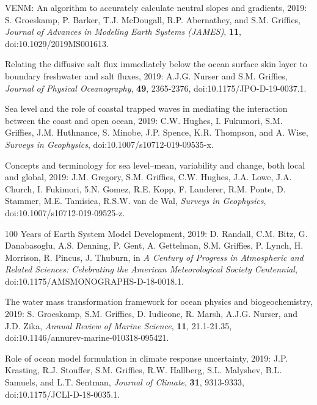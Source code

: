 \begin{etaremune}
\item VENM: An algorithm to accurately calculate neutral slopes and gradients, 2019: S. Groeskamp, P. Barker, T.J. McDougall, R.P. Abernathey, and S.M. Grif\/f\/ies, {\it Journal of Advances in Modeling Earth Systems (JAMES)}, {\bf 11}, doi:10.1029/2019MS001613.

\item Relating the diffusive salt flux immediately below the ocean surface skin layer to boundary freshwater and salt fluxes, 2019: A.J.G. Nurser and S.M. Grif\/f\/ies, {\it Journal of Physical Oceanography}, {\bf 49}, 2365-2376, doi:10.1175/JPO-D-19-0037.1.

\item Sea level and the role of coastal trapped waves in mediating the interaction between the coast and open ocean, 2019: C.W. Hughes, I. Fukumori, S.M. Grif\/f\/ies, J.M. Huthnance, S. Minobe, J.P. Spence, K.R. Thompson, and A. Wise, {\it Surveys in Geophysics},
doi:10.1007/s10712-019-09535-x.

\item Concepts and terminology for sea level--mean, variability and change, both local and global, 2019: J.M. Gregory, S.M. Grif\/f\/ies, C.W. Hughes, J.A. Lowe, J.A. Church, I. Fukimori, 5.N. Gomez, R.E. Kopp, F. Landerer, R.M. Ponte, D. Stammer, M.E. Tamisiea, R.S.W. van de Wal, {\it Surveys in Geophysics},
doi:10.1007/s10712-019-09525-z.

\item 100 Years of Earth System Model Development, 2019: D. Randall, C.M. Bitz, G. Danabasoglu, A.S. Denning, P. Gent, A. Gettelman, S.M. Grif\/f\/ies, P. Lynch, H. Morrison, R. Pincus, J. Thuburn, in {\it A Century of Progress in Atmospheric and Related Sciences: Celebrating the American Meteorological Society Centennial}, doi:10.1175/AMSMONOGRAPHS-D-18-0018.1.

\item The water mass transformation framework for ocean physics and biogeochemistry, 2019: S. Groeskamp, S.M. Grif\/f\/ies, D. Iudicone,  R. Marsh, A.J.G. Nurser, and J.D. Zika, {\it Annual Review of Marine Science}, {\bf 11}, 21.1-21.35, doi:10.1146/annurev-marine-010318-095421.

\item Role of ocean model formulation in climate response uncertainty, 2019: J.P. Krasting, R.J. Stouffer, S.M. Grif\/f\/ies, R.W. Hallberg, S.L. Malyshev, B.L. Samuels, and L.T. Sentman, {\it Journal of Climate}, {\bf 31}, 9313-9333, doi:10.1175/JCLI-D-18-0035.1.


\end{etaremune}
